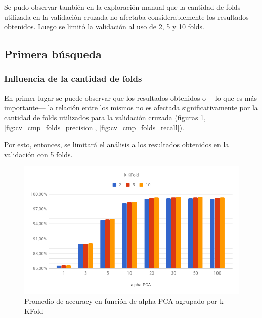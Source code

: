 Se pudo observar también en la exploración manual que la cantidad de folds utilizada en la validación cruzada no afectaba considerablemente los resultados obtenidos. Luego se limitó la validación al uso de 2, 5 y 10 folds.

\subsection{Primera búsqueda}

\subsubsection{Influencia de la cantidad de folds}

En primer lugar se puede observar que los resultados obtenidos o ---lo que es más importante--- la relación entre los mismos no es afectada significativamente por la cantidad de folds utilizados para la validación cruzada (figuras \ref{fig:cv_cmp_folds_accuracy}, \ref{fig:cv_cmp_folds_precision}, \ref{fig:cv_cmp_folds_recall}).

Por esto, entonces, se limitará el análisis a los resultados obtenidos en la validación con 5 folds.

\begin{figure}[h]
    \centering
    \includegraphics[width=\textwidth]{graficos/cv_cmp_folds_accuracy.png}
    \caption{Promedio de accuracy en función de alpha-PCA agrupado por k-KFold}
    \label{fig:cv_cmp_folds_accuracy}
\end{figure}

